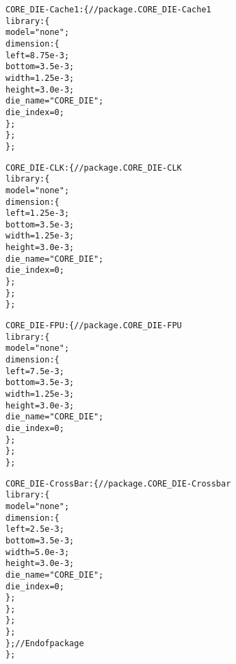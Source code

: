 {\begin{alltt}
            CORE\_DIE-Cache1: \{ // package.CORE\_DIE-Cache1
                library: \{
                    model = "none";
                    dimension: \{
                        left = 8.75e-3;
                        bottom = 3.5e-3;
                        width = 1.25e-3;
                        height = 3.0e-3;
                        die_name = "CORE_DIE";
                        die_index = 0;
                    \};
                \};
            \};
            
            CORE\_DIE-CLK: \{ // package.CORE\_DIE-CLK
                library: \{
                    model = "none";
                    dimension: \{
                        left = 1.25e-3;
                        bottom = 3.5e-3;
                        width = 1.25e-3;
                        height = 3.0e-3;
                        die_name = "CORE_DIE";
                        die_index = 0;
                    \};
                \};
            \};
            
            CORE\_DIE-FPU: \{ // package.CORE\_DIE-FPU
                library: \{
                    model = "none";
                    dimension: \{
                        left = 7.5e-3;
                        bottom = 3.5e-3;
                        width = 1.25e-3;
                        height = 3.0e-3;
                        die_name = "CORE_DIE";
                        die_index = 0;
                    \};
                \};
            \};
            
            CORE\_DIE-CrossBar: \{ // package.CORE\_DIE-Crossbar
                library: \{
                    model = "none";
                    dimension: \{
                        left = 2.5e-3;
                        bottom = 3.5e-3;
                        width = 5.0e-3;
                        height = 3.0e-3;
                        die_name = "CORE_DIE";
                        die_index = 0;
                    \};
                \};
            \};
        \};
    \}; // End of package
\};
\end{alltt}
}

\pagebreak
